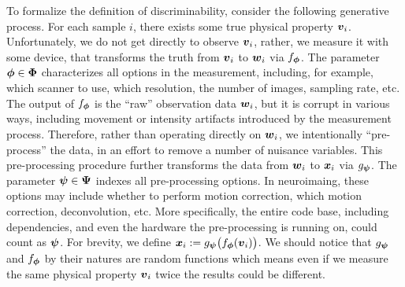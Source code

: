 \documentclass{article}
\begin{document}
To formalize the definition of discriminability, consider the following generative process. For each sample $i$, there exists some true physical property $\boldsymbol{v}_i$. Unfortunately, we do not get directly to observe $\boldsymbol{v}_i$, rather, we measure it with some device, that transforms the truth from $\boldsymbol{v}_i$ to $\boldsymbol{w}_i$ via $f_{\boldsymbol{\phi}}$. The parameter $\boldsymbol{\phi} \in \boldsymbol{\Phi}$ characterizes all options in the measurement, including, for example, which scanner to use, which resolution, the number of images, sampling rate, etc.  The output of $f_{\boldsymbol{\phi}}$ is the  ``raw'' observation data $\boldsymbol{w}_i$, but it is corrupt in various ways, including movement or intensity artifacts introduced by the measurement process.  Therefore, rather than operating directly on $\boldsymbol{w}_i$, we intentionally ``pre-process'' the data, in an effort to remove a number of nuisance variables.  This pre-processing procedure further transforms the data from $\boldsymbol{w}_i$ to $\boldsymbol{x}_i$ via $g_{\boldsymbol{\psi}}$.   The parameter $\boldsymbol{\psi} \in \boldsymbol{\Psi}$ indexes all pre-processing options. In neuroimaing, these options may include whether to perform motion correction, which motion correction, deconvolution, etc.  More specifically, the entire code base, including dependencies, and even the hardware the pre-processing is running on, could count as $\boldsymbol{\psi}$. For brevity, we define $\boldsymbol{x}_i:= g_{\boldsymbol{\psi}} \big(f_{\boldsymbol{\phi}} (\boldsymbol{v}_i) \big)$. We should notice that $g_{\boldsymbol{\psi}}$ and $f_{\boldsymbol{\phi}}$ by their natures are random functions which means even if we measure the same physical property $\boldsymbol{v}_i$ twice the results could be different.
\end{document}
